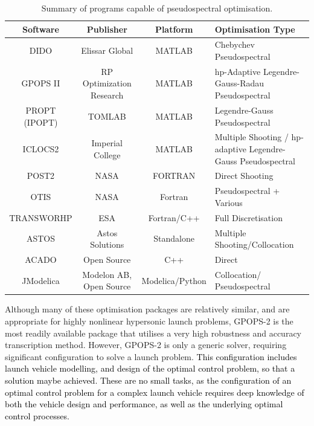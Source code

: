 \begin{table}[ht]
	
	\begin{tabular}{|c|c|c| p{4cm}|}
		\hline \textbf{Software} & \textbf{Publisher} & \textbf{Platform} & \textbf{Optimisation Type} \\ 
		\hline DIDO\cite{Ross2002} & Elissar Global & MATLAB & Chebychev Pseudospectral \\ 
		\hline GPOPS II\cite{Rao2010} & RP Optimization Research & MATLAB & \textsf{hp}-Adaptive Legendre-Gauss-Radau Pseudospectral \\ 
		\hline PROPT (IPOPT)\cite{Rutquist2010}& TOMLAB & MATLAB & Legendre-Gauss  Pseudospectral  \\ 
		\hline ICLOCS2\cite{iclocs} & Imperial College & MATLAB &  Multiple Shooting / \textsf{hp}-adaptive Legendre-Gauss Pseudospectral  \\ 
		\hline POST2\cite{WilliamColson} & NASA & FORTRAN & Direct Shooting \\ 
		\hline OTIS\cite{otis} & NASA  & Fortran & Pseudospectral + Various  \\ 
		\hline TRANSWORHP\cite{Wassel2013} & ESA & Fortran/C++ & Full Discretisation \\ 
		\hline ASTOS\cite{astos} & Astos Solutions & Standalone & Multiple Shooting/Collocation  \\  
		\hline ACADO\cite{Houska2011} & Open Source & C++ &  Direct \\  
		\hline JModelica\cite{jmodelica} & Modelon AB, Open Source & Modelica/Python &  Collocation/ Pseudospectral \\  
		
		\hline 
	\end{tabular} 
	
	\caption{Summary of programs capable of pseudospectral optimisation.}
	\label{table:programs}
\end{table}

Although many of these optimisation packages are relatively similar, and are appropriate for highly nonlinear hypersonic launch problems, GPOPS-2 is the most readily available package that utilises a very high robustness and accuracy transcription method. However, GPOPS-2 is only a generic solver, requiring significant configuration to solve a launch problem. \textcolor{black}{This configuration includes launch vehicle modelling, and design of the optimal control problem, so that a solution maybe achieved. These are no small tasks, as the configuration of an optimal control problem for a complex launch vehicle requires deep knowledge of both the vehicle design and performance, as well as the underlying optimal control processes. } 














